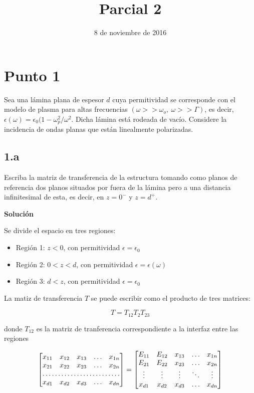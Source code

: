 \documentclass[a4paper,11pt]{article}
\title{{\bf\Large Parcial 2}}
\author{\normalfont
\author[{Juan Sebastián Valbuena Bermúdez}\\\normalfont\sc Universidad Nacional de Colombia \\\normalfont\sc Electrodinámica 2}
\date{8 de noviembre de 2016}
\begin{document}
%

\maketitle
\author{}

\section*{Punto 1}
Sea una lámina plana de espesor $d$ cuya permitividad se corresponde con el modelo de plasma para altas frecuencias $(\omega >> \omega_o,\ \omega>>\Gamma)$, es decir,  $\epsilon(\omega)=\epsilon_0 (1- \omega_p^2 / \omega^2$. Dicha lámina está rodeada de vacío. Considere la incidencia de ondas planas que están linealmente polarizadas.


\subsection*{1.a}
Escriba la matriz de transferencia de la estructura tomando como planos de referencia dos planos situados por fuera de la lámina pero a una distancia infinitesimal de esta, es decir, en $z=0^-$ y $z=d^+$.

\textbf{Solución}

Se divide el espacio en tres regiones: 
\begin{itemize}
    \item Región 1: $z<0$, con permitividad $\epsilon = \epsilon_0$
    
    \item Región 2: $0<z<d$, con permitividad $\epsilon = \epsilon(\omega)$
    
    \item Región 3: $d<z$, con permitividad $\epsilon = \epsilon_0$
\end{itemize}

La matiz de transferencia $T$ se puede escribir como el producto de tres matrices:

$$T=T_{12}T_{2}T_{23}$$

donde $T_12$ es la matriz de tranferencia correspondiente a la interfaz entre las regiones



\[
\begin{bmatrix}
    x_{11}       & x_{12} & x_{13} & \dots & x_{1n} \\
    x_{21}       & x_{22} & x_{23} & \dots & x_{2n} \\
    \hdotsfor{5} \\
    x_{d1}       & x_{d2} & x_{d3} & \dots & x_{dn}
\end{bmatrix}
=
\begin{bmatrix}
    E_{11} & E_{12} & x_{13} & \dots  & x_{1n} \\
    E_{21} & E_{22} & x_{23} & \dots  & x_{2n} \\
    \vdots & \vdots & \vdots & \ddots & \vdots \\
    x_{d1} & x_{d2} & x_{d3} & \dots  & x_{dn}
\end{bmatrix}
\]
\end{document}
